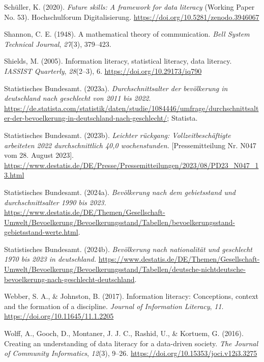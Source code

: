 \documentclass[
  12pt,
  a4paper,
  twoside]{article}
\newlength{\cslhangindent}
\newenvironment{CSLReferences}[2] %
 {\begin{list}{}{%
  \setlength{\itemindent}{0pt}
  \setlength{\leftmargin}{0pt}
  \setlength{\parsep}{0pt}
  \ifodd #1
   \setlength{\leftmargin}{\cslhangindent}
   \setlength{\itemindent}{-1\cslhangindent}
  \fi
  \setlength{\itemsep}{#2\baselineskip}}}
 {\end{list}}
\begin{document}
\begin{CSLReferences}{1}{0}
Schüller, K. (2020). \emph{Future skills: A framework for data literacy} (Working Paper No. 53). Hochschulforum Digitalisierung. \url{https://doi.org/10.5281/zenodo.3946067}

Shannon, C. E. (1948). A mathematical theory of communication. \emph{Bell System Technical Journal}, \emph{27}(3), 379--423.

Shields, M. (2005). Information literacy, statistical literacy, data literacy. \emph{IASSIST Quarterly}, \emph{28}(2--3), 6. \url{https://doi.org/10.29173/iq790}

Statistisches Bundesamt. (2023a). \emph{Durchschnittsalter der bevölkerung in deutschland nach geschlecht von 2011 bis 2022}. \url{https://de.statista.com/statistik/daten/studie/1084446/umfrage/durchschnittsalter-der-bevoelkerung-in-deutschland-nach-geschlecht/}; Statista.

Statistisches Bundesamt. (2023b). \emph{Leichter rückgang: Vollzeitbeschäftigte arbeiteten 2022 durchschnittlich 40,0 wochenstunden.} {[}Pressemitteilung Nr. N047 vom 28. August 2023{]}. \url{https://www.destatis.de/DE/Presse/Pressemitteilungen/2023/08/PD23_N047_13.html}

Statistisches Bundesamt. (2024a). \emph{Bevölkerung nach dem gebietsstand und durchschnitts­alter 1990 bis 2023.} \url{https://www.destatis.de/DE/Themen/Gesellschaft-Umwelt/Bevoelkerung/Bevoelkerungsstand/Tabellen/bevoelkerungsstand-gebietsstand-werte.html}.

Statistisches Bundesamt. (2024b). \emph{Bevölkerung nach nationalität und geschlecht 1970 bis 2023 in deutschland.} \url{https://www.destatis.de/DE/Themen/Gesellschaft-Umwelt/Bevoelkerung/Bevoelkerungsstand/Tabellen/deutsche-nichtdeutsche-bevoelkerung-nach-geschlecht-deutschland}.

Webber, S. A., \& Johnston, B. (2017). Information literacy: Conceptions, context and the formation of a discipline. \emph{Journal of Information Literacy}, \emph{11}. \url{https://doi.org/10.11645/11.1.2205}

Wolff, A., Gooch, D., Montaner, J. J. C., Rashid, U., \& Kortuem, G. (2016). Creating an understanding of data literacy for a data-driven society. \emph{The Journal of Community Informatics}, \emph{12}(3), 9--26. \url{https://doi.org/10.15353/joci.v12i3.3275}

\end{CSLReferences}
\end{document}
